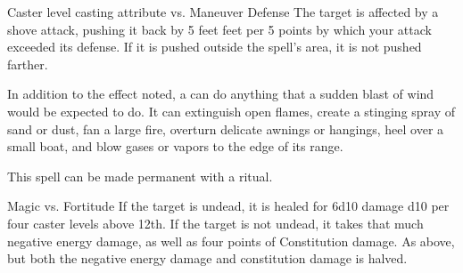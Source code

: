 \begin{spellheader}
\end{spellheader}
\begin{spelleffects}
    \begin{spellattack}{Caster level \add casting attribute vs. Maneuver Defense}
        \spellsuccess The target is affected by a shove attack, pushing it back by 5 feet  feet per 5 points by which your attack exceeded its defense. If it is pushed outside the spell's area, it is not pushed farther.
    \end{spellattack}
\end{spelleffects}
\begin{spellfooter}
    \spellnotes In addition to the effect noted, a  can do anything that a sudden blast of wind would be expected to do. It can extinguish open flames, create a stinging spray of sand or dust, fan a large fire, overturn delicate awnings or hangings, heel over a small boat, and blow gases or vapors to the edge of its range.

    This spell can be made permanent with a  ritual.
\end{spellfooter}

\begin{comment}
\subsubsection{H}
\end{comment}

\begin{spellheader}
    \spellrng{\rngclose}
\end{spellheader}
\begin{spelleffects}
    \begin{spellattack}{Magic vs. Fortitude}
        \spelleffect If the target is undead, it is healed for 6d10 damage \add d10 per four caster levels above 12th.
        \spellsuccess If the target is not undead, it takes that much negative energy damage, as well as four points of Constitution damage.
        \spellfailure As above, but both the negative energy damage and constitution damage is halved.
    \end{spellattack}
\end{spelleffects}
\begin{spellfooter}

\end{spellfooter}

